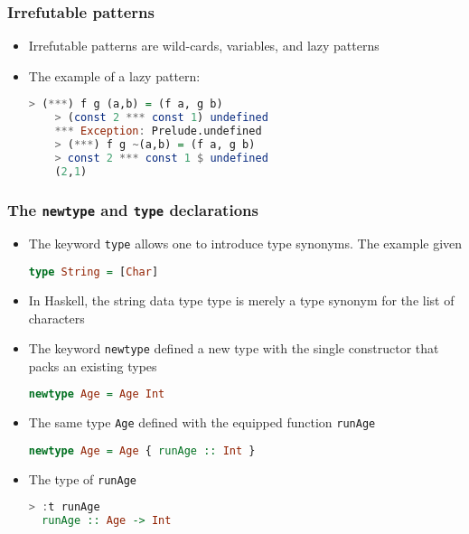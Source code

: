 \documentclass[10pt,pdf,utf8,russian,aspectratio=169]{beamer}
\begin{document}
\begin{frame}[fragile]
  \frametitle{Irrefutable patterns}
  \begin{itemize}
    \item Irrefutable patterns are wild-cards, variables, and lazy patterns
    \item The example of a lazy pattern:
    \begin{lstlisting}[language=Haskell]
    > (***) f g (a,b) = (f a, g b)
    > (const 2 *** const 1) undefined
    *** Exception: Prelude.undefined
    > (***) f g ~(a,b) = (f a, g b)
    > const 2 *** const 1 $ undefined
    (2,1)
    \end{lstlisting}
  \end{itemize}
\end{frame}

\begin{frame}[fragile]
\frametitle{The \verb"newtype" and \verb"type" declarations}

\begin{itemize}
  \item The keyword \verb"type" allows one to introduce type synonyms. The example given
  \begin{lstlisting}[language=Haskell]
  type String = [Char]
  \end{lstlisting}
  \item In Haskell, the string data type type is merely a type synonym for the list of characters
  \item The keyword \verb"newtype" defined a new type with the single constructor that packs an existing types
  \begin{lstlisting}[language=Haskell]
  newtype Age = Age Int
  \end{lstlisting}
  \item The same type \verb"Age" defined with the equipped function \verb"runAge"
  \begin{lstlisting}[language=Haskell]
  newtype Age = Age { runAge :: Int }
  \end{lstlisting}
  \item The type of \verb"runAge"
  \begin{lstlisting}[language=Haskell]
  > :t runAge
  runAge :: Age -> Int
  \end{lstlisting}
\end{itemize}
\end{frame}
\end{document}
